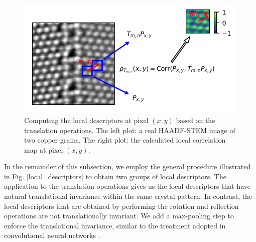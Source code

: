 \documentclass[twocolumn,amsmath, floatfix]{revtex4}
\begin{document}
\begin{figure}[htbp]
\centering
\includegraphics[width=1.\columnwidth]{schematic_diagram_local_correlation_map.png}
\caption{Computing the local descriptors at pixel $(x,y)$ based on the translation operations. The left plot: a real HAADF-STEM image of two copper grains. The right plot: the calculated local correlation map at pixel $(x,y)$. } 
\label{fig:local_correlation_map}
\end{figure}

In the remainder of this subsection, we employ the general procedure illustrated in Fig. \ref{local_descriptors} to obtain two groups of local descriptors. The application to the translation operations gives us the local descriptors that have natural translational invariance within the same crystal pattern. In contrast, the local descriptors that are obtained by performing the rotation and reflection operations are not translationally invariant. We add a max-pooling step to enforce the translational invariance, similar to the treatment adopted in convolutional neural networks \cite{Lecun2010}. 
\end{document}
